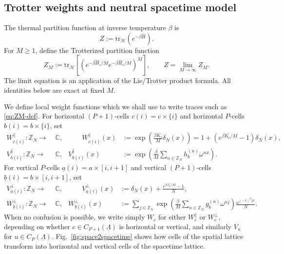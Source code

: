 \documentclass[dvipsnames,a4paper]{article}
\numberwithin{equation}{section}
\theoremstyle{definition}
\theoremstyle{remark}
\newcommand{\tr}{\mathrm{tr}}
\begin{document}
\subsection{Trotter weights and neutral spacetime model}
\label{sec:trotter-weights}

The thermal partition function at inverse temperature \(\beta\) is
\begin{equation}
	Z
	:=
	\tr_{\mathcal H}\left(e^{-\beta\hat H}\right).
	\label{eq:Z-quantum-def}
\end{equation}
For \(M\ge1\), define the Trotterized partition function
\begin{equation}
	Z_M
	:=
	\tr_{\mathcal H}
	\left[
	\left(
	e^{-\beta\hat H_z/M}e^{-\beta\hat H_x/M}
	\right)^M
	\right],
	\qquad
	Z=\lim_{M\to\infty}Z_M.
	\label{eq:ZM-def}
\end{equation}
The limit equation is an application of the Lie/Trotter product formula. All identities below are exact at fixed \(M\).

We define local weight functions which we shall use to write traces such as \eqref{eq:ZM-def}. For horizontal
\((P+1)\)-cells \(c(i)=c\times\{i\}\) and horizontal \(P\)-cells \(b(i)=b\times\{i\}\), set
\begin{subequations}
	\begin{align}
		W_{c(i)}^{\parallel}:\mathbb Z_N \to&\; \mathbb C,
		&\qquad
		W_{c(i)}^{\parallel}(x)
		&:=
		\exp\left(\frac{\beta K_c}{M}\delta_N(x)\right)
		=
		1+\left(e^{\beta K_c/M}-1\right)\delta_N(x),
		\label{eq:W-parallel}
		\\
		V_{b(i)}^{\parallel}:\mathbb Z_N \to&\; \mathbb C,
		&
		V_{b(i)}^{\parallel}(x)
		&:=
		\exp\left(
		\frac{\beta}{M}
		\sum_{n\in\mathbb Z_N}h_b^{(n)}\omega^{nx}
		\right).
		\label{eq:V-parallel}
	\end{align}
	\label{eq:parallel-weights}
\end{subequations}
For vertical \(P\)-cells \(\underline a(i)=a\times[i,i+1]\) and vertical
\((P+1)\)-cells \(\underline b(i)=b\times[i,i+1]\), set
\begin{subequations}
	\begin{align}
		V_{\underline a(i)}^{\perp}:\mathbb Z_N \to&\; \mathbb C,
		&\qquad
		V_{\underline a(i)}^{\perp}(x)
		&:=
		\delta_N(x)+\frac{e^{\beta J_a/M}-1}{N},
		\label{eq:V-perp}
		\\
		W_{\underline b(i)}^{\perp}:\mathbb Z_N \to&\; \mathbb C,
		&
		W_{\underline b(i)}^{\perp}(x)
		&:=
		\sum_{j\in\mathbb Z_N}
		\exp\left(
		\frac{\beta}{M}
		\sum_{n\in\mathbb Z_N}g_b^{(n)}\omega^{nj}
		\right)
		\frac{\omega^{(-1)^Pjx}}{N}.
		\label{eq:W-perp}
	\end{align}
	\label{eq:perp-weights}
\end{subequations}
When no confusion is possible, we write simply \(W_c\) for either \(W_c^\parallel\) or
\(W_c^\perp\), depending on whether \(c\in C_{P+1}(\underline\Lambda)\) is horizontal or vertical,
and similarly \(V_u\) for \(u\in C_P(\underline\Lambda)\). Fig.~\ref{fig:space2spacetime} shows how cells of the spatial lattice transform into horizontal and vertical cells of the spacetime lattice.
\end{document}
